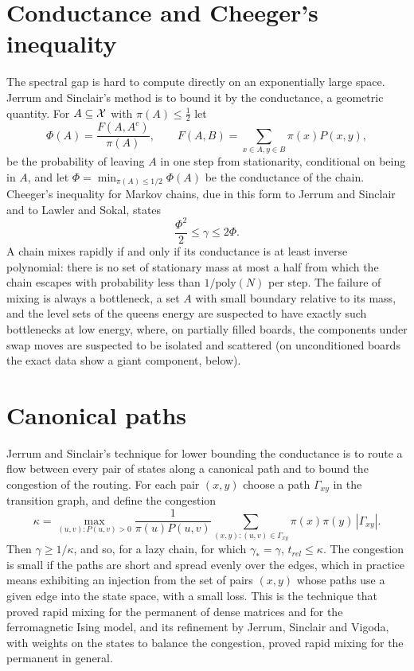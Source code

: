 \section{Conductance and Cheeger's inequality}

The spectral gap is hard to compute directly on an exponentially large space. Jerrum and Sinclair's method is to bound it by the conductance, a geometric quantity. For $A \subseteq \mathcal{X}$ with $\pi(A) \le \tfrac12$ let
\[
\Phi(A) = \frac{F(A, A^c)}{\pi(A)} , \qquad F(A, B) = \sum_{x \in A, y \in B} \pi(x) P(x, y) ,
\]
be the probability of leaving $A$ in one step from stationarity, conditional on being in $A$, and let $\Phi = \min_{\pi(A) \le 1/2} \Phi(A)$ be the conductance of the chain. Cheeger's inequality for Markov chains, due in this form to Jerrum and Sinclair and to Lawler and Sokal, states
\[
\frac{\Phi^2}{2} \le \gamma \le 2 \Phi .
\]
A chain mixes rapidly if and only if its conductance is at least inverse polynomial: there is no set of stationary mass at most a half from which the chain escapes with probability less than $1/\mathrm{poly}(N)$ per step. The failure of mixing is always a bottleneck, a set $A$ with small boundary relative to its mass, and the level sets of the queens energy are suspected to have exactly such bottlenecks at low energy, where, on partially filled boards, the components under swap moves are suspected to be isolated and scattered (on unconditioned boards the exact data show a giant component, below).

\section{Canonical paths}

Jerrum and Sinclair's technique for lower bounding the conductance is to route a flow between every pair of states along a canonical path and to bound the congestion of the routing. For each pair $(x, y)$ choose a path $\Gamma_{xy}$ in the transition graph, and define the congestion
\[
\kappa = \max_{(u, v) : P(u, v) > 0} \frac{1}{\pi(u) P(u, v)} \sum_{(x, y) : (u, v) \in \Gamma_{xy}} \pi(x) \pi(y) \, |\Gamma_{xy}| .
\]
Then $\gamma \ge 1 / \kappa$, and so, for a lazy chain, for which $\gamma_* = \gamma$, $t_{rel} \le \kappa$. The congestion is small if the paths are short and spread evenly over the edges, which in practice means exhibiting an injection from the set of pairs $(x, y)$ whose paths use a given edge into the state space, with a small loss. This is the technique that proved rapid mixing for the permanent of dense matrices and for the ferromagnetic Ising model, and its refinement by Jerrum, Sinclair and Vigoda, with weights on the states to balance the congestion, proved rapid mixing for the permanent in general.


